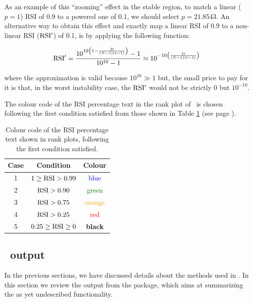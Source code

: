 As an example of this ``zooming'' effect in the stable region, to match a linear ($p=1$) RSI of 0.9 to a powered one of 0.1, we should select $p=21.8543$. An alternative way to obtain this effect and exactly map a linear RSI of 0.9 to a non-linear RSI (${\rm RSI'}$) of 0.1, is by applying the following function:
\begin{linenomath}
$${\rm RSI'} = \frac{10^{10\left(1-\frac{D}{(N-1)(t-1)}\right)}-1}{10^{10}-1} \approx 10^{-10\left(\frac{D}{(N-1)(t-1)}\right)}$$
\end{linenomath}
where the approximation is valid because $10^{10}\gg 1$ but, the small price to pay for it is that, in the worst instability case, the ${\rm RSI'}$ would not be strictly $0$ but $10^{-10}$.

The colour code of the RSI percentage text in the rank plot of \CC\ is chosen following the first condition satisfied from those shown in Table \ref{tab:RSI} (see page \pageref{tab:RSI}). 

\begin{table}
  \begin{center}
    \begin{tabular}{ccc}
    \hline
    Case  &  Condition  &  Colour  \\
    \hline
    1  &  $1\ge{\rm RSI}>0.99$  & \textcolor{blue}{blue}  \\ 
    2  & ${\rm RSI}>0.90$  &  \textcolor{green}{green}  \\
    3  &  ${\rm RSI}>0.75$  &  \textcolor{orange}{orange} \\
    4  &  ${\rm RSI}>0.25$  &  \textcolor{red}{red} \\
    5  &  $0.25\ge{\rm RSI}\ge0$  &  \bfseries{black}  \\
    \hline
    \end{tabular}
  \end{center}
  \caption{Colour code of the RSI percentage text shown in rank plots, following the first condition satisfied.}
  \label{tab:RSI}
\end{table}

\subsection*{\CC\ output}
In the previous sections, we have discussed details about the methods used in \CC. In this section we review the output from the package, which aims at summarizing the as yet undescribed functionality. 

